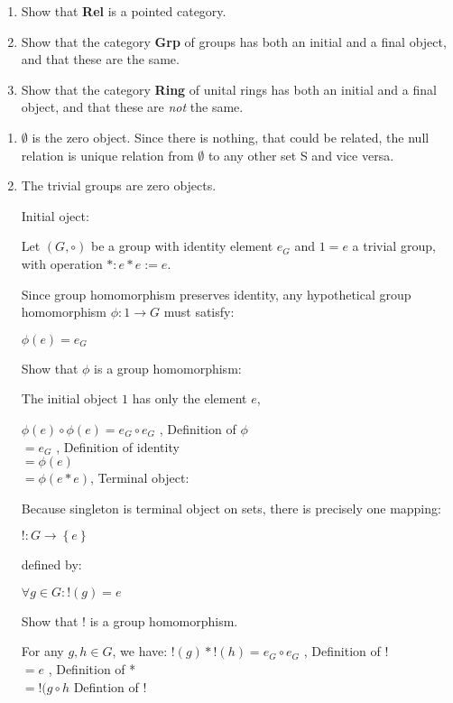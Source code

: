 \begin{exercise}
  \begin{enumerate}
  \item Show that \textbf{Rel} is a pointed category.
  \item Show that the category \textbf{Grp} of groups has both an initial and a final object, and that these are the same.
  \item Show that the category \textbf{Ring} of unital rings has both an initial and a final object, and that these are \emph{not} the same.
  \end{enumerate}
\end{exercise}

\begin{answer}
  \begin{enumerate}
  \item $\emptyset$ is the zero object. Since there is nothing, that could be related, the null relation is unique relation from $\emptyset$ to any other set S and vice versa.
  \item The trivial groups are zero objects.

    Initial oject:

    Let $\left({G, \circ}\right)$ be a group with identity element $e_G$ and $1={e}$ a trivial group, with operation $*: e*e := e$.

    Since group homomorphism preserves identity, any hypothetical group homomorphism $\phi: 1 \to G$ must satisfy:

    $\phi (e) = e_G$

    Show  that $\phi$ is  a group homomorphism:

    The initial object $1$ has only the element $e$,

    $\phi (e) \circ \phi (e) = e_G \circ e_G $ , Definition of $\phi$
    \\$= e_G$ , Definition of identity
    \\$= \phi (e)$
    \\$= \phi (e * e)$, Terminal object:

    Because singleton is terminal object on sets, there is precisely one mapping:

    $!: G \to \left\{{e}\right\}$

    defined by:

    $\forall g \in G: ! (g) = e$

    Show that $!$ is a group homomorphism.

    For any $g, h \in G$, we have:
    $!(g)*!(h) = e_G \circ e_G $ , Definition of !
    \\$= e$ , Definition of *
    \\$= !(g \circ h$ Defintion of !


\end{enumerate}
\end{answer}
